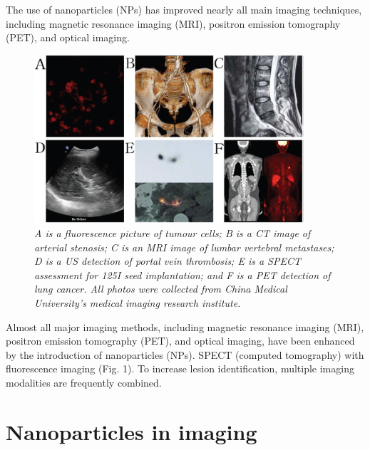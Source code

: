 \documentclass[12pt]{article}
\begin{document}
The use of nanoparticles (NPs) has improved nearly all main imaging techniques, including magnetic resonance imaging (MRI), positron emission tomography (PET), and optical imaging. 

\begin{figure}[htp]
    \centering
    \includegraphics[width=10cm]{6.png}
    \caption{\textit{A is a fluorescence picture of tumour cells; B is a CT image of arterial stenosis; C is an MRI image of lumbar vertebral metastases; D is a US detection of portal vein thrombosis; E is a SPECT assessment for 125I seed implantation; and F is a PET detection of lung cancer. All photos were collected from China Medical University's medical imaging research institute.}}
    \label{fig:1}
\end{figure}
Almost all major imaging methods, including magnetic resonance imaging (MRI), positron emission tomography (PET), and optical imaging, have been enhanced by the introduction of nanoparticles (NPs). SPECT (computed tomography) with fluorescence imaging (Fig. 1). To increase lesion identification, multiple imaging modalities are frequently combined. 

\section*{Nanoparticles in imaging }
\end{document}

